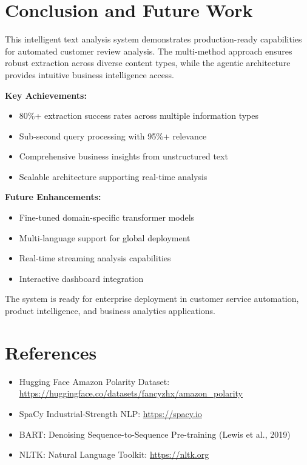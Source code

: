 \documentclass[11pt,a4paper]{article}
\begin{document}
\section{Conclusion and Future Work}

This intelligent text analysis system demonstrates production-ready capabilities for automated customer review analysis. The multi-method approach ensures robust extraction across diverse content types, while the agentic architecture provides intuitive business intelligence access.

\textbf{Key Achievements:}
\begin{itemize}[noitemsep]
    \item 80\%+ extraction success rates across multiple information types
    \item Sub-second query processing with 95\%+ relevance
    \item Comprehensive business insights from unstructured text
    \item Scalable architecture supporting real-time analysis
\end{itemize}

\textbf{Future Enhancements:}
\begin{itemize}[noitemsep]
    \item Fine-tuned domain-specific transformer models
    \item Multi-language support for global deployment
    \item Real-time streaming analysis capabilities
    \item Interactive dashboard integration
\end{itemize}

The system is ready for enterprise deployment in customer service automation, product intelligence, and business analytics applications.

\section*{References}

\begin{itemize}[noitemsep]
\item Hugging Face Amazon Polarity Dataset: \url{https://huggingface.co/datasets/fancyzhx/amazon_polarity}
\item SpaCy Industrial-Strength NLP: \url{https://spacy.io}
\item BART: Denoising Sequence-to-Sequence Pre-training (Lewis et al., 2019)
\item NLTK: Natural Language Toolkit: \url{https://nltk.org}
\end{itemize}
\end{document}
